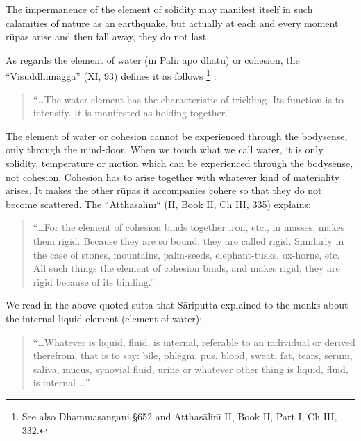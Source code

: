 \documentclass{book}
\begin{document}
The impermanence of the element of solidity may manifest itself in such
calamities of nature as an earthquake, but actually at each and every
moment r\=upas arise and then fall away, they do not last.

As regards the element of water (in P{\=a}li: {\=a}po dh{\=a}tu) or
cohesion, the ``Visuddhimagga'' (XI, 93) defines it as follows
\footnote{See also Dhamma\-sanga\d ni {\S}652 and Atthas{\=a}lin\=\i{}  II,
Book II, Part I, Ch III, 332.} : 




\begin{quote}\begin{flushleft} 
``\ldots The water element has the characteristic of trickling. Its function is to intensify. It is manifested as holding together.''
\end{flushleft}\end{quote}




The element of water or cohesion cannot be experienced through the
bodysense, only through the mind-door. When we touch what we call
water, it is only solidity, temperature or motion which can be
experienced through the bodysense, not cohesion. Cohesion has to arise
together with whatever kind of materiality arises. It makes the other
r\=upas it accompanies cohere so that they do not become scattered. The
``Atthas{\=a}lin\=\i`` (II, Book II, Ch III, 335) explains:




\begin{quote}\begin{flushleft}
``\dots For the element of cohesion binds together iron, etc., in masses,
makes them rigid. Because they are so bound, they are called rigid.
Similarly in the case of stones, mountains, palm-seeds,
elephant-tusks, ox-horns, etc. All such things the element of
cohesion binds, and makes rigid; they are rigid because of its
binding.''
\end{flushleft}\end{quote}




We read in the above quoted sutta that S{\=a}riputta explained to the
monks about the internal liquid element (element of water):




\begin{quote}\begin{flushleft}
``\ldots Whatever is liquid, fluid, is internal, referable to an
individual or derived therefrom, that is to say: bile, phlegm, pus,
blood, sweat, fat, tears, serum, saliva, mucus, synovial fluid, urine
or whatever other thing is liquid, fluid, is internal \ldots''
\end{flushleft}\end{quote}
\end{document}

